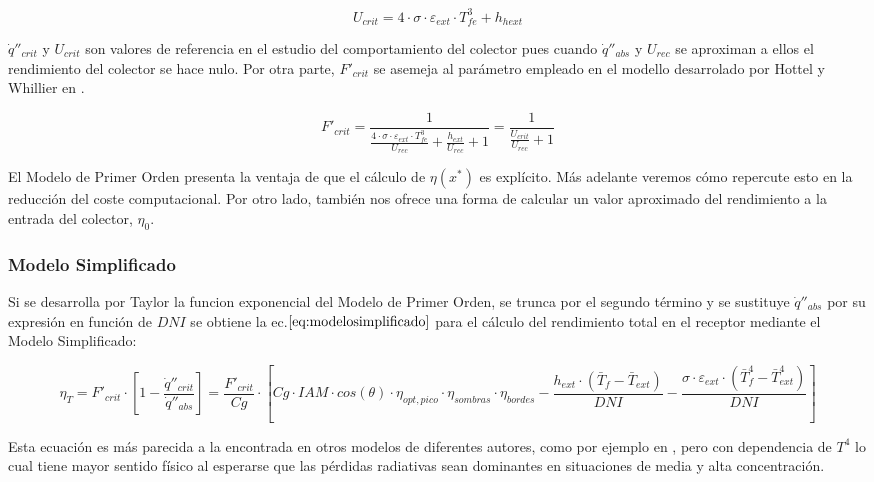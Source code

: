 \documentclass[11pt]{article}
\begin{document}
\begin{equation}
    U_{crit} = 4 \cdot \sigma \cdot \varepsilon_{ext} \cdot T^{3}_{fe} + h_{hext}
    \label{eq:ucrit}
\end{equation}

\(\dot q''_{crit}\) y \(U_{crit}\) son valores de referencia en el
estudio del comportamiento del colector pues cuando \(\dot q''_{abs}\) y
\(U_{rec}\) se aproximan a ellos el rendimiento del colector se hace
nulo. Por otra parte, \(F'_{crit}\) se asemeja al parámetro empleado en
el modello desarrolado por Hottel y Whillier en \cite{1022085/DVRL97SH}.

\begin{equation}
    F'_{crit} = \frac{1}{\frac{4 \cdot \sigma \cdot \varepsilon_{ext} \cdot T^{3}_{fe}}{U_{rec}} + \frac{h_{ext}}{U_{rec}} +1} = \frac{1}{\frac{U_{crit}}{U_{rec}}+1}
    \label{eq:fcrit}
\end{equation}

El Modelo de Primer Orden presenta la ventaja de que el cálculo de
\(\eta(x^{*})\) es explícito. Más adelante veremos cómo repercute esto
en la reducción del coste computacional. Por otro lado, también nos
ofrece una forma de calcular un valor aproximado del rendimiento a la
entrada del colector, \(\eta_{0}\).

\hypertarget{modelo-simplificado}{%
\subsubsection{Modelo Simplificado}\label{modelo-simplificado}}

Si se desarrolla por Taylor la funcion exponencial del Modelo de Primer
Orden, se trunca por el segundo término y se sustituye
\(\dot q''_{abs}\) por su expresión en función de \(DNI\) se obtiene la
ec.\(\eqref{eq:modelosimplificado}\) para el cálculo del rendimiento
total en el receptor mediante el Modelo Simplificado:

\begin{equation}
    \eta_{T} = F'_{crit} \cdot \left[1 - \frac{\dot q''_{crit}}{\dot q''_{abs}}\right] = \frac{F'_{crit}}{Cg} \cdot \left[Cg \cdot IAM \cdot cos(\theta) \cdot \eta_{opt,pico} \cdot \eta_{sombras} \cdot \eta_{bordes} - \frac{h_{ext}\cdot (\bar{T}_{f}-\bar{T}_{ext})}{DNI} - \frac{\sigma \cdot \varepsilon_{ext}\cdot(\bar{T}^{4}_{f}-\bar{T}^{4}_{ext})}{DNI}\right] 
    \label{eq:modelosimplificado}
\end{equation}

Esta ecuación es más parecida a la encontrada en otros modelos de
diferentes autores, como por ejemplo en
\cite{1022085/DVRL97SH}\cite{1022085/HI2ETXYA}, pero con dependencia de
\(T^{4}\) lo cual tiene mayor sentido físico al esperarse que las
pérdidas radiativas sean dominantes en situaciones de media y alta
concentración.
\end{document}
